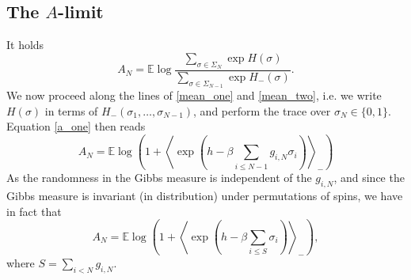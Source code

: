 \documentclass[a4paper,12pt,oneside,reqno]{amsart}
\numberwithin{equation}{section}
\begin{document}
\subsection{The $A$-limit}
It holds
\begin{equation} \label{a_one}
A_N = {{\mathbb{E}}} \log \frac{\sum_{{\sigma} \in \Sigma_N} \exp H({\sigma})}{\sum_{{\sigma} \in \Sigma_{N-1}} \exp H_-({\sigma})}.
\end{equation}
We now proceed along the lines of \eqref{mean_one} and \eqref{mean_two}, i.e. we write $H({\sigma})$ in terms of 
$H_-({\sigma}_1, \dots, {\sigma}_{N-1})$, and perform the trace over ${\sigma}_N\in \{0,1\}$. Equation \eqref{a_one} then reads 
\begin{equation} \label{a_two}
A_N = {{\mathbb{E}}} \log\left(1 + \left< \exp\left( h- {\beta} \sum_{i\leq N-1} g_{i, N} {\sigma}_i \right)\right>_- \right)
\end{equation}
As the randomness in the Gibbs measure is independent of the $g_{i,N}$, and since the Gibbs measure is invariant (in distribution) under permutations of spins, we have in fact that
\begin{equation} \label{a_three}
A_N = {{\mathbb{E}}} \log\left(1 + \left< \exp\left( h- {\beta} \sum_{i\leq S} {\sigma}_i \right)\right>_- \right),
\end{equation}
where $S = \sum\limits_{i<N} g_{i,N}$. 
\end{document}
